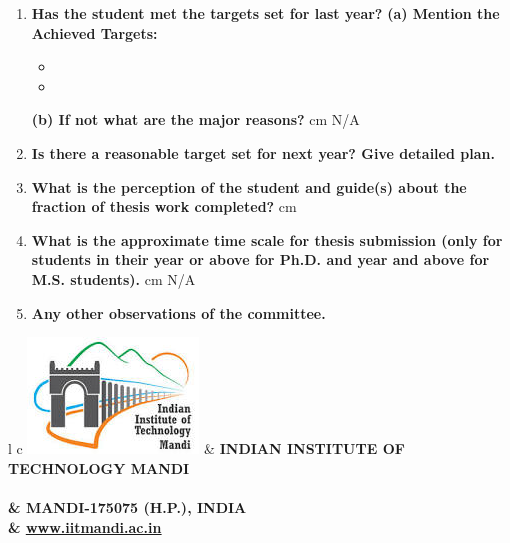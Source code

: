 \documentclass[12 pt, a4paper]{article}
\begin{document}
\begin{enumerate}
    \item \textbf{Has the student met the targets set for last year?}
    \vskip 0.2cm
	\textbf{(a) Mention the Achieved Targets:}
	
	\begin{itemize}
	    \item 
	    \item 
	\end{itemize}
	\textbf{(b) If not what are the major reasons?}
	\vskip 0.2cm
	 cm N/A
	\vspace{0.2cm}
	\item \textbf{Is there a reasonable target set for next year? Give detailed plan.}
	\begin{figure}[h]
    \centering  
    \end{figure}
	\item \textbf{What is the perception of the student and guide(s) about the fraction of thesis work completed?}
	\vskip 0.2cm
	 cm 
	\item\textbf{What is the approximate time scale for thesis submission (only for students in their
		\bf {} year or above for Ph.D. and  year and above for M.S. students).}
	\vskip 0.2cm
	 cm N/A
	\item\bf{Any other observations of the committee.}
	\vspace*{1.0 cm}


\end{enumerate}
\clearpage
{}
\pagestyle{empty}
\vskip 0.2cm
\begin{tabular}{l c}
	{\includegraphics[scale=0.50]{logo.jpg}}                              &
	\large\bf{INDIAN INSTITUTE OF TECHNOLOGY MANDI} \\
	\\ & \large\bf{MANDI-175075 (H.P.), INDIA} \\ & \underline{\href{www.iitmandi.ac.in}{www.iitmandi.ac.in}}
\end{tabular}
\end{document}
